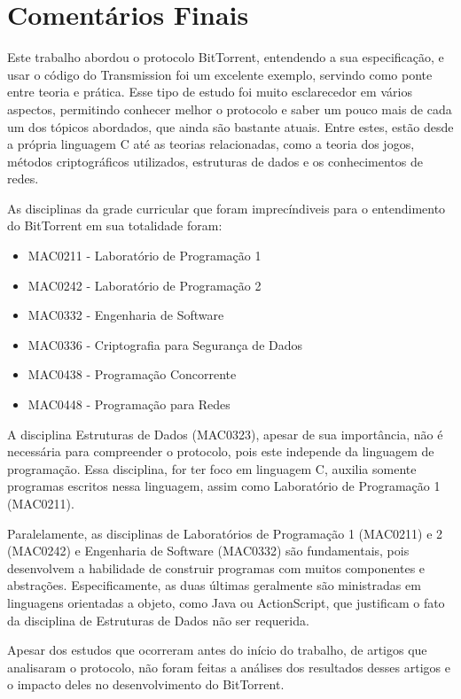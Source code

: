 
\chapter{Comentários Finais}

Este trabalho abordou o protocolo BitTorrent, entendendo a sua especificação, e usar o
código do Transmission foi um excelente exemplo, servindo como ponte entre teoria e
prática. Esse tipo de estudo foi muito esclarecedor em vários aspectos, permitindo
conhecer melhor o protocolo e saber um pouco mais de cada um dos tópicos abordados, que
ainda são bastante atuais. Entre estes, estão desde a própria linguagem C até as
teorias relacionadas, como a teoria dos jogos, métodos criptográficos utilizados,
estruturas de dados e os conhecimentos de redes.

As disciplinas da grade curricular que foram imprecíndiveis para o entendimento do
BitTorrent em sua totalidade foram:

\begin{itemize}
    \item MAC0211 - Laboratório de Programação 1
    \item MAC0242 - Laboratório de Programação 2
    \item MAC0332 - Engenharia de Software
    \item MAC0336 - Criptografia para Segurança de Dados
    \item MAC0438 - Programação Concorrente
    \item MAC0448 - Programação para Redes
\end{itemize}

A disciplina Estruturas de Dados (MAC0323), apesar de sua importância, não é necessária
para compreender o protocolo, pois este independe da linguagem de programação. Essa
disciplina, for ter foco em linguagem C, auxilia somente programas escritos nessa
linguagem, assim como Laboratório de Programação 1 (MAC0211).

Paralelamente, as disciplinas de Laboratórios de Programação 1 (MAC0211) e 2 (MAC0242)
e Engenharia de Software (MAC0332) são fundamentais, pois desenvolvem a habilidade de
construir programas com muitos componentes e abstrações. Especificamente, as duas
últimas geralmente são ministradas em linguagens orientadas a objeto, como Java ou
ActionScript, que justificam o fato da disciplina de Estruturas de Dados não ser
requerida.

Apesar dos estudos que ocorreram antes do início do trabalho, de artigos que analisaram
o protocolo, não foram feitas a análises dos resultados desses artigos e o impacto deles
no desenvolvimento do BitTorrent.

\afterpage{\clearpage}